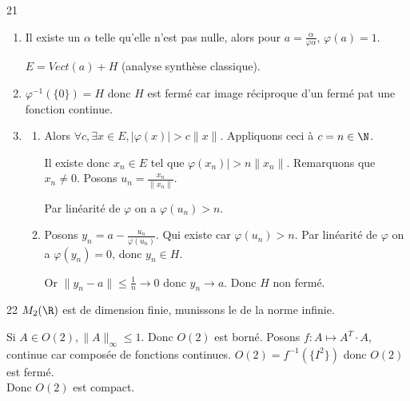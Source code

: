 \begin{correction}{21}
\begin{enumerate}
    \item Il existe un $\alpha$ telle qu'elle n'est pas nulle, alors pour $a = \frac {\alpha} {\varphi{\alpha}}$, $\varphi{(a)} =1$.

    $E = Vect(a) + H$ (analyse synthèse classique).

    \item $\varphi^{-1}{(\{0\})} = H$ donc $H$ est fermé car image réciproque d'un fermé pat une fonction continue.

    \item
    \begin{enumerate}
        \item Alors $\forall c, \exists x \in E, |\varphi(x)| > c\|x\|$.
        Appliquons ceci à $c = n \in \N$.
        
        Il existe donc $x_n \in E$ tel que $\varphi(x_n)| > n \|x_n\|$.
        Remarquons que $x_n \not = 0$.
        Posons $u_n = \frac {x_n} {\|x_n\|}$.

        Par linéarité de $\varphi$ on a $\varphi(u_n) > n$.

        \item Posons $y_n = a - \frac {u_n} {\varphi(u_n)}$. Qui existe car $\varphi(u_n) > n$.
        Par linéarité de $\varphi$ on a $\varphi(y_n) = 0$, donc $y_n \in H$.

        Or $\|y_n - a\| \leqslant \frac 1 n \to 0$ donc $y_n \to a$. Donc $H$ non fermé.
    \end{enumerate}
\end{enumerate}    
\end{correction}

\begin{correction}{22}
    $M_2(\R)$ est de dimension finie, munissons le de la norme infinie.

    Si $A \in O(2), \| A\|_{\infty} \leqslant 1$. Donc $O(2)$ est borné.
    Posons $f: A \mapsto A^T \cdot A$, continue car composée de fonctions continues.
    $O(2) = f^{-1}(\{I^2\})$ donc $O(2)$ est fermé. \\

    Donc $O(2)$ est compact.
\end{correction}


